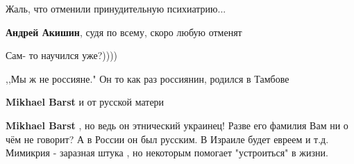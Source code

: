 \begin{itemize}
 
Жаль, что отменили принудительную психиатрию...

 
\textbf{Андрей Акишин}, судя по всему, скоро любую отменят

 
Сам- то научился уже?))))

 
,,Мы ж не россияне." Он то как раз россиянин, родился в Тамбове

 
\textbf{Mikhael Barst} и от русской матери

 
\textbf{Mikhael Barst} , но ведь он этнический украинец! Разве его фамилия Вам
ни о чём не говорит? А в России он был русским. В Израиле будет евреем и т.д.
Мимикрия - заразная штука , но некоторым помогает "устроиться" в жизни.

\end{itemize}


